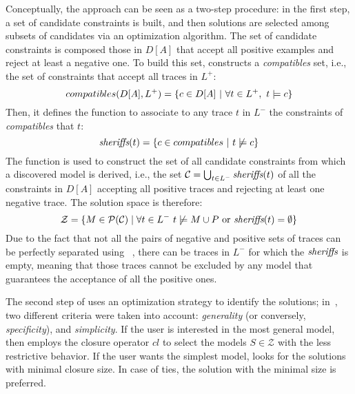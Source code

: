 Conceptually, the \nd approach can be seen as a two-step procedure: in the first step, a set of candidate constraints is built, and then solutions are selected among subsets of candidates via an optimization algorithm.
%
The set of candidate constraints is composed  %
those in $D[A]$ that accept all positive examples and reject at least a negative one. To build this set, \nd constructs a \emph{compatibles} set, i.e., the set of constraints that accept all traces in $L^+$: 
\begin{equation}
{compatibles(D[A], L^+)} = \{c\in D[A]~|~\forall t\in L^+,~ t\models c \} \\
\end{equation}
%
Then, it defines the \textit{\sheriff} function to associate to any trace $t$ in $L^-$ the constraints of \textit{compatibles} that  %
$t$:
\begin{equation}
{\textit{sheriffs}}(t) = \{c\in {compatibles}~|~t\not\models c\} \\
\end{equation}
%
The \textit{\sheriff} function is used to construct the set of all candidate constraints from which a discovered model is derived, i.e., the set $\mathcal{C} = \bigcup_{t\in L^-} \textit{sheriffs}(t)$ of all the constraints in $D[A]$ accepting all positive traces and rejecting at least one negative trace. The solution space is therefore:
\begin{equation}
  \mathcal{Z}=\{M\in\mathcal{P}(\mathcal{C})\mid \forall t\in L^-~t\not\models M\cup P \text{ or } {\textit{sheriffs}}(t) = \emptyset \}
\end{equation}
Due to the fact that not all the pairs of negative and positive sets of traces can be perfectly separated using \declare~\cite{DBLP:conf/bpm/SlaatsDB21}, there can be traces in $L^-$ for which the ${\textit{sheriffs}}$ is empty, meaning that those traces cannot be excluded by any model that guarantees the acceptance of all the positive ones.

The second step of \nd uses an optimization strategy to identify the solutions; in~\cite{deviant-tkde}, two different criteria were taken into account: \emph{generality} (or conversely, \emph{specificity}), and \emph{simplicity}.
If the user is interested in the most general model, then \nd employs the closure operator $cl$ to select the models $S \in \mathcal{Z}$ with the less restrictive behavior.
If the user wants the simplest model, \nd looks for the solutions with minimal closure size. In case of ties, the solution with the minimal size is preferred.




